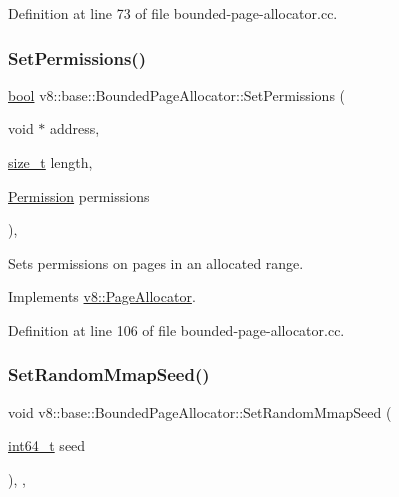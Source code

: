 Definition at line 73 of file bounded-\/page-\/allocator.\+cc.

\mbox{\label{classv8_1_1base_1_1BoundedPageAllocator_ae5b6f900d5722eb27be5eb376b8228a3}} 
\subsubsection{\texorpdfstring{Set\+Permissions()}{SetPermissions()}}
{\footnotesize\ttfamily \mbox{\hyperlink{classbool}{bool}} v8\+::base\+::\+Bounded\+Page\+Allocator\+::\+Set\+Permissions (\begin{DoxyParamCaption}\item[{void $\ast$}]{address,  }\item[{\mbox{\hyperlink{classsize__t}{size\+\_\+t}}}]{length,  }\item[{\mbox{\hyperlink{classv8_1_1PageAllocator_a88f74b164fe97e053259f67a95758415}{Permission}}}]{permissions }\end{DoxyParamCaption})\hspace{0.3cm}{\ttfamily [override]}, {\ttfamily [virtual]}}

Sets permissions on pages in an allocated range. 

Implements \mbox{\hyperlink{classv8_1_1PageAllocator_aa3817d5bfaba9ec280a6cfb60e6adda0}{v8\+::\+Page\+Allocator}}.



Definition at line 106 of file bounded-\/page-\/allocator.\+cc.

\mbox{\label{classv8_1_1base_1_1BoundedPageAllocator_a53d343cc7d2acb2f059e6dd4ea29bc0f}} 
\subsubsection{\texorpdfstring{Set\+Random\+Mmap\+Seed()}{SetRandomMmapSeed()}}
{\footnotesize\ttfamily void v8\+::base\+::\+Bounded\+Page\+Allocator\+::\+Set\+Random\+Mmap\+Seed (\begin{DoxyParamCaption}\item[{\mbox{\hyperlink{classint64__t}{int64\+\_\+t}}}]{seed }\end{DoxyParamCaption})\hspace{0.3cm}{\ttfamily [inline]}, {\ttfamily [override]}, {\ttfamily [virtual]}}

